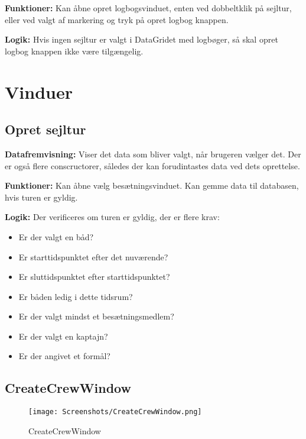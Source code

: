 \textbf{Funktioner:} 
Kan åbne opret logbogsvinduet, enten ved dobbeltklik på sejltur, eller ved valgt af markering og tryk på opret logbog knappen. 

\textbf{Logik:} 
Hvis ingen sejltur er valgt i DataGridet med logbøger, så skal opret logbog knappen ikke være tilgængelig.



\section{Vinduer}
\subsection{Opret sejltur}

\textbf{Datafremvisning:} 
Viser det data som bliver valgt, når brugeren vælger det. 
Der er også flere conscructorer, således der kan forudintastes data ved dets oprettelse.

\textbf{Funktioner:} 
Kan åbne vælg besætningsvinduet. 
Kan gemme data til databasen, hvis turen er gyldig.

\textbf{Logik:} 
Der verificeres om turen er gyldig, der er flere krav:
\begin{itemize}
    \item Er der valgt en båd?
    \item Er starttidspunktet efter det nuværende?
    \item Er sluttidspunktet efter starttidspunktet?
    \item Er båden ledig i dette tidsrum?
    \item Er der valgt mindst et besætningsmedlem?
    \item Er der valgt en kaptajn?
    \item Er der angivet et formål?
\end{itemize}


\subsection{CreateCrewWindow}

\begin{wrapfigure}{r}{0.5\textwidth}
    \label{img:login_interface}
    \vspace{-20pt}
    \begin{center}
        \texttt{[image: Screenshots/CreateCrewWindow.png]}
    \end{center}
    \vspace{-20pt}
    \caption{CreateCrewWindow}
    \vspace{-30pt}
\end{wrapfigure}

